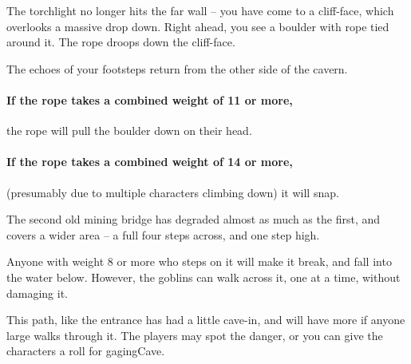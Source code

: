 \begin{multicols}{2}
\begin{boxtext}
  The torchlight no longer hits the far wall -- you have come to a cliff-face, which overlooks a massive drop down.
  Right ahead, you see a boulder with rope tied around it.
  The rope droops down the cliff-face.

  The echoes of your footsteps return from the other side of the cavern.
\end{boxtext}

\paragraph{If the rope takes a combined \gls{weight} of 11 or more,}
the rope will pull the boulder down on their head.

\paragraph{If the rope takes a combined \gls{weight} of 14 or more,}
(presumably due to multiple characters climbing down) it will snap.



\begin{exampletext}
  The second old mining bridge has degraded almost as much as the first, and covers a wider area -- a full four \glspl{step} across, and one \gls{step} high.
\end{exampletext}

Anyone with \gls{weight} 8 or more who steps on it will make it break, and fall into the water below.
However, the goblins can walk across it, one at a time, without damaging it.





This path, like the entrance has had a little cave-in, and will have more if anyone large walks through it.
The players may spot the danger, or you can give the characters a roll for \gls{gagingCave}.


\end{multicols}
